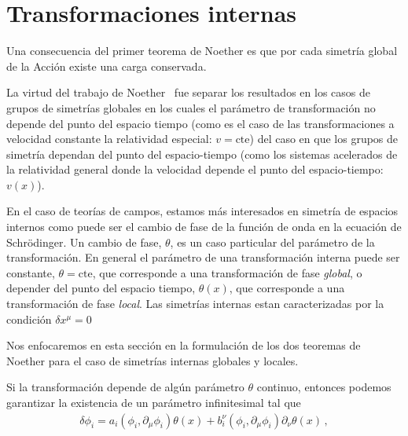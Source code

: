 \section{Transformaciones internas}

Una consecuencia del primer teorema de Noether es que por cada simetría global de la Acción existe una carga conservada. 




La virtud del trabajo de Noether~\cite{Noether,Brading:2000hc,Brading:2003nv,Sundermeyer:2014kha} fue separar los resultados  en los casos de grupos de simetrías globales en los cuales el parámetro de transformación no depende del punto del espacio tiempo (como es el caso de las transformaciones a velocidad constante la relatividad especial: $v=\text{cte}$) del caso en que los grupos de simetría dependan del punto del espacio-tiempo (como los sistemas acelerados de la relatividad general donde la velocidad depende el punto del espacio-tiempo: $v(x)$).

En el caso de teorías de campos, estamos más interesados en simetría de espacios internos como puede ser el cambio de fase de la función de onda en la ecuación de Schrödinger. Un cambio de fase, $\theta$, es un caso particular del parámetro de la transformación. En general el parámetro de una transformación interna puede ser constante, $\theta=\text{cte}$, que corresponde a una transformación de fase  \emph{global}, o depender del punto del espacio tiempo, $\theta(x)$, que corresponde  a una transformación  de fase \emph{local}. Las simetrías internas estan caracterizadas por la condición $\delta x^\mu=0$ 

Nos enfocaremos en esta sección en la formulación de los dos teoremas de Noether para el caso de simetrías internas globales y locales.   


Si la transformación depende de algún parámetro $\theta$ continuo, entonces podemos garantizar la existencia de un parámetro infinitesimal tal que
\begin{align}
\label{eq:infdt}
 \delta\phi_i= a_{i}\left( \phi_{i},\partial_{\mu}\phi_{i} \right) \theta(x)+b^{\nu}_i \left( \phi_{i},\partial_{\mu}\phi_{i} \right) \partial_{\nu}\theta(x)\,,
\end{align}

